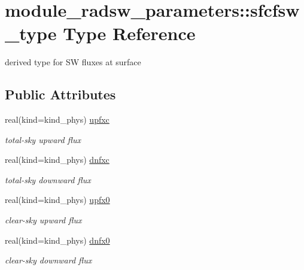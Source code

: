 \hypertarget{structmodule__radsw__parameters_1_1sfcfsw__type}{}\section{module\+\_\+radsw\+\_\+parameters\+:\+:sfcfsw\+\_\+type Type Reference}
\label{structmodule__radsw__parameters_1_1sfcfsw__type}


derived type for SW fluxes at surface  


\subsection*{Public Attributes}
\textbf{ }\par
\begin{DoxyCompactItemize}
\item 
\mbox{\label{structmodule__radsw__parameters_1_1sfcfsw__type_a89e2285e3148921e989cb27cda4294a1}} 
real(kind=kind\+\_\+phys) \hyperlink{structmodule__radsw__parameters_1_1sfcfsw__type_a89e2285e3148921e989cb27cda4294a1}{upfxc}
\begin{DoxyCompactList}\small\item\em total-\/sky upward flux \end{DoxyCompactList}\item 
\mbox{\label{structmodule__radsw__parameters_1_1sfcfsw__type_a0e5e6bfe14ffd1a9c1c8abfc730db4ba}} 
real(kind=kind\+\_\+phys) \hyperlink{structmodule__radsw__parameters_1_1sfcfsw__type_a0e5e6bfe14ffd1a9c1c8abfc730db4ba}{dnfxc}
\begin{DoxyCompactList}\small\item\em total-\/sky downward flux \end{DoxyCompactList}\item 
\mbox{\label{structmodule__radsw__parameters_1_1sfcfsw__type_a6bfa85d5917ebc4ebc4ef079e3cf3eca}} 
real(kind=kind\+\_\+phys) \hyperlink{structmodule__radsw__parameters_1_1sfcfsw__type_a6bfa85d5917ebc4ebc4ef079e3cf3eca}{upfx0}
\begin{DoxyCompactList}\small\item\em clear-\/sky upward flux \end{DoxyCompactList}\item 
\mbox{\label{structmodule__radsw__parameters_1_1sfcfsw__type_a2b1a4d8e0e93332fd08f3aa6b68fb141}} 
real(kind=kind\+\_\+phys) \hyperlink{structmodule__radsw__parameters_1_1sfcfsw__type_a2b1a4d8e0e93332fd08f3aa6b68fb141}{dnfx0}
\begin{DoxyCompactList}\small\item\em clear-\/sky downward flux \end{DoxyCompactList}\end{DoxyCompactItemize}



